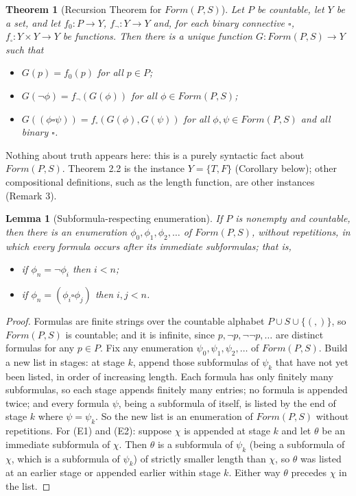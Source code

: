 \documentclass{article}
\newtheorem{theorem}{Theorem}
\newtheorem{lemma}{Lemma}
\theoremstyle{remark}\newtheorem{remark}{Remark}
\begin{document}
\begin{theorem}[Recursion Theorem for $Form(P,S)$]
Let $P$ be countable, let $Y$ be a set, and let $f_0 \colon P \to Y$, $f_{\neg} \colon Y \to Y$ and, for each binary connective $\square$, $f_{\square} \colon Y \times Y \to Y$ be functions. Then there is a unique function $G \colon Form(P, S) \to Y$ such that
\begin{itemize}
    \item[(R0)] $G(p) = f_0(p)$ for all $p \in P$;
    \item[(R1)] $G(\neg\phi) = f_{\neg}(G(\phi))$ for all $\phi \in Form(P, S)$;
    \item[(R2)] $G((\phi \square \psi)) = f_{\square}(G(\phi), G(\psi))$ for all
    $\phi, \psi \in Form(P, S)$ and all binary $\square$.
\end{itemize}
\end{theorem}

Nothing about truth appears here: this is a purely syntactic fact about $Form(P, S)$. Theorem 2.2 is the instance $Y = \{T, F\}$ (Corollary below); other compositional definitions, such as the length function, are other instances (Remark 3).

\begin{lemma}[Subformula-respecting enumeration]
If $P$ is nonempty and countable, then there is an enumeration $\phi_0, \phi_1, \phi_2, \dots$ of $Form(P, S)$, without repetitions, in which every formula occurs after its immediate subformulas; that is,
\begin{itemize}
    \item[(E1)] if $\phi_n = \neg\phi_i$ then $i < n$;
    \item[(E2)] if $\phi_n = (\phi_i \square \phi_j)$ then $i, j < n$.
\end{itemize}
\end{lemma}

\begin{proof}
Formulas are finite strings over the countable alphabet $P \cup S \cup \{(, )\}$, so $Form(P, S)$ is countable; and it is infinite, since $p, \neg p, \neg\neg p, \dots$ are distinct formulas for any $p \in P$. Fix any enumeration $\psi_0, \psi_1, \psi_2, \dots$ of $Form(P, S)$. Build a new list in stages: at stage $k$, append those subformulas of $\psi_k$ that have not yet been listed, in order of increasing length. Each formula has only finitely many subformulas, so each stage appends finitely many entries; no formula is appended twice; and every formula $\psi$, being a subformula of itself, is listed by the end of stage $k$ where $\psi = \psi_k$. So the new list is an enumeration of $Form(P, S)$ without repetitions. For (E1) and (E2): suppose $\chi$ is appended at stage $k$ and let $\theta$ be an immediate subformula of $\chi$. Then $\theta$ is a subformula of $\psi_k$ (being a subformula of $\chi$, which is a subformula of $\psi_k$) of strictly smaller length than $\chi$, so $\theta$ was listed at an earlier stage or appended earlier within stage $k$. Either way $\theta$ precedes $\chi$ in the list.
\end{proof}
\end{document}
